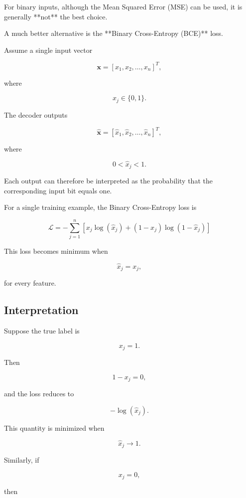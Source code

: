 \documentclass{article}
\begin{document}
	For binary inputs, although the Mean Squared Error (MSE) can be used,
	it is generally **not** the best choice.
	
	A much better alternative is the **Binary Cross-Entropy (BCE)** loss.
	
	Assume a single input vector
	
	\[
	\mathbf{x}
	=
	[x_1,x_2,\ldots,x_n]^T,
	\]
	
	where
	
	\[
	x_j\in\{0,1\}.
	\]
	
	The decoder outputs
	
	\[
	\hat{\mathbf{x}}
	=
	[\hat{x}_1,\hat{x}_2,\ldots,\hat{x}_n]^T,
	\]
	
	where
	
	\[
	0<\hat{x}_j<1.
	\]
	
	Each output can therefore be interpreted as the probability that the
	corresponding input bit equals one.
	
	
	For a single training example, the Binary Cross-Entropy loss is
	
	\[
	\boxed{
		\mathcal{L}
		=
		-
		\sum_{j=1}^{n}
		\left[
		x_j\log(\hat{x}_j)
		+
		(1-x_j)\log(1-\hat{x}_j)
		\right]
	}
	\]
	
	This loss becomes minimum when
	
	\[
	\hat{x}_j=x_j,
	\]
	
	for every feature.
	
	\subsection*{Interpretation}
	
	Suppose the true label is
	
	\[
	x_j=1.
	\]
	
	Then
	
	\[
	1-x_j=0,
	\]
	
	and the loss reduces to
	
	\[
	-\log(\hat{x}_j).
	\]
	
	This quantity is minimized when
	
	\[
	\boxed{\hat{x}_j\rightarrow1.}
	\]
	
	Similarly, if
	
	\[
	x_j=0,
	\]
	
	then
	
\end{document}
